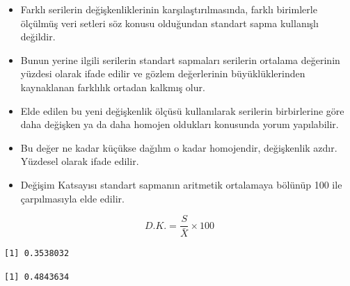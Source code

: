 \documentclass[
  letterpaper,
  DIV=11,
  numbers=noendperiod]{scrreprt}
\newenvironment{Shaded}{\begin{snugshade}}{\end{snugshade}}
\newcommand{\AttributeTok}[1]{\textcolor[rgb]{0.40,0.45,0.13}{#1}}
\newcommand{\ConstantTok}[1]{\textcolor[rgb]{0.56,0.35,0.01}{#1}}
\newcommand{\FunctionTok}[1]{\textcolor[rgb]{0.28,0.35,0.67}{#1}}
\newcommand{\NormalTok}[1]{\textcolor[rgb]{0.00,0.23,0.31}{#1}}
\newcommand{\OtherTok}[1]{\textcolor[rgb]{0.00,0.23,0.31}{#1}}
\newcommand{\SpecialCharTok}[1]{\textcolor[rgb]{0.37,0.37,0.37}{#1}}
\begin{document}
\begin{itemize}
\item
  Farklı serilerin değişkenliklerinin karşılaştırılmasında, farklı
  birimlerle ölçülmüş veri setleri söz konusu olduğundan standart sapma
  kullanışlı değildir.
\item
  Bunun yerine ilgili serilerin standart sapmaları serilerin ortalama
  değerinin yüzdesi olarak ifade edilir ve gözlem değerlerinin
  büyüklüklerinden kaynaklanan farklılık ortadan kalkmış olur.
\item
  Elde edilen bu yeni değişkenlik ölçüsü kullanılarak serilerin
  birbirlerine göre daha değişken ya da daha homojen oldukları konusunda
  yorum yapılabilir.
\item
  Bu değer ne kadar küçükse dağılım o kadar homojendir, değişkenlik
  azdır. Yüzdesel olarak ifade edilir.
\item
  Değişim Katsayısı standart sapmanın aritmetik ortalamaya bölünüp 100
  ile çarpılmasıyla elde edilir.
\end{itemize}

\[D.K. = \frac{S}{\bar{X}}\times{100}\]

\begin{Shaded}
\end{Shaded}

\begin{verbatim}
[1] 0.3538032
\end{verbatim}

\begin{Shaded}
\end{Shaded}

\begin{verbatim}
[1] 0.4843634
\end{verbatim}
\end{document}
